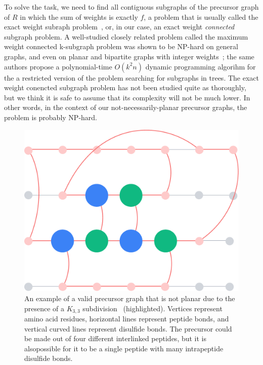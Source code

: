 To solve the task, we need to find all contiguous subgraphs of the precursor graph of \(R\) in which the sum of weights is exactly \(f\), a problem that is usually called the exact weight subraph problem~\cite{abboud2013exact}, or, in our case, an exact weight \emph{connected} subgraph problem. A well-studied closely related problem called the maximum weight connected k-subgraph problem was shown to be NP-hard on general graphs, and even on planar and bipartite graphs with integer weights~\cite{hochbaum1994node}; the same authors propose a polynomial-time \(O(k^2n)\) dynamic programming algorihm for the a restricted version of the problem searching for subgraphs in trees. The exact weight conencted subgraph problem has not been studied quite as thoroughly, but we think it is safe to assume that its complexity will not be much lower. In other words, in the context of our not-necessarily-planar precursor graphs, the problem is probably NP-hard.

\begin{figure}
  \centering
  \includegraphics[width=0.9\linewidth]{img/nonplanar.pdf}
  \caption{An example of a valid precursor graph that is not planar due to the presence of a \(K_{3, 3}\) subdivision~\cite{kuratowski1930probleme} (highlighted). Vertices represent amino acid residues, horizontal lines represent peptide bonds, and vertical curved lines represent disulfide bonds. The precursor could be made out of four different interlinked peptides, but it is alsopossible for it to be a single peptide with many intrapeptide disulfide bonds.}\label{fig:nonplanar}
\end{figure}

